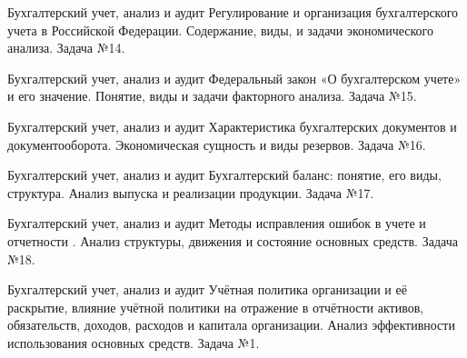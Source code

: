 \documentclass[
	11pt,
	a4paper,
	]
	{article}
\begin{document}
	

\begin{minipage}[t][\miniH]{\miniL}\centering
	 {Бухгалтерский учет, анализ и аудит}
		{
			Регулирование и организация бухгалтерского учета в Российской Федерации.
		}{
			Содержание, виды, и задачи экономического анализа.
		}{
			Задача №14.
		}
	\lowGE
\end{minipage}

\vfill



\begin{minipage}[t][\miniH]{\miniL}\centering
	 {Бухгалтерский учет, анализ и аудит}
		{
			Федеральный закон «О бухгалтерском учете» и его значение.
		}{
			Понятие, виды и задачи факторного анализа.
		}{
			Задача №15.
		}
	\lowGE
\end{minipage}

\vfill



\begin{minipage}[t][\miniH]{\miniL}\centering
	 {Бухгалтерский учет, анализ и аудит}
		{
			Характеристика бухгалтерских документов и документооборота.
		}{
			Экономическая сущность и виды резервов.
		}{
			Задача №16.
		}
	\lowGE
\end{minipage}





\begin{minipage}[t][\miniH]{\miniL}\centering
	 {Бухгалтерский учет, анализ и аудит}
		{
			Бухгалтерский баланс: понятие, его виды, структура.
		}{
			Анализ выпуска и реализации продукции.
		}{
			Задача №17.
		}
	\lowGE
\end{minipage}

\vfill



\begin{minipage}[t][\miniH]{\miniL}\centering
	 {Бухгалтерский учет, анализ и аудит}
		{
			Методы исправления ошибок в учете и отчетности .
		}{
			Анализ структуры, движения и состояние основных средств.
		}{
			Задача №18.
		}
	\lowGE
\end{minipage}

\vfill



\begin{minipage}[t][\miniH]{\miniL}\centering
	 {Бухгалтерский учет, анализ и аудит}
		{
			Учётная политика организации и её раскрытие, влияние учётной политики на отражение в отчётности активов, обязательств, доходов, расходов и капитала организации.
		}{
			Анализ эффективности использования основных средств.
		}{
			Задача №1.
		}
	\lowGE
\end{minipage}
\end{document}
